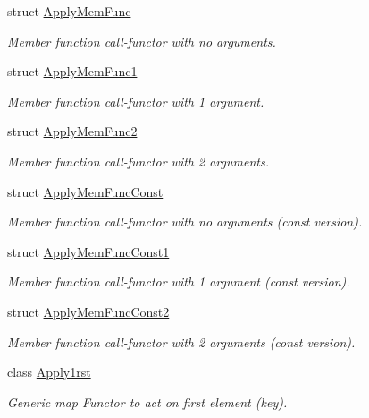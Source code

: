 \begin{DoxyCompactItemize}
struct \hyperlink{struct_d_d4hep_1_1_apply_mem_func}{ApplyMemFunc}
\begin{DoxyCompactList}\small\item\em Member function call-\/functor with no arguments. \item\end{DoxyCompactList}\item 
struct \hyperlink{struct_d_d4hep_1_1_apply_mem_func1}{ApplyMemFunc1}
\begin{DoxyCompactList}\small\item\em Member function call-\/functor with 1 argument. \item\end{DoxyCompactList}\item 
struct \hyperlink{struct_d_d4hep_1_1_apply_mem_func2}{ApplyMemFunc2}
\begin{DoxyCompactList}\small\item\em Member function call-\/functor with 2 arguments. \item\end{DoxyCompactList}\item 
struct \hyperlink{struct_d_d4hep_1_1_apply_mem_func_const}{ApplyMemFuncConst}
\begin{DoxyCompactList}\small\item\em Member function call-\/functor with no arguments (const version). \item\end{DoxyCompactList}\item 
struct \hyperlink{struct_d_d4hep_1_1_apply_mem_func_const1}{ApplyMemFuncConst1}
\begin{DoxyCompactList}\small\item\em Member function call-\/functor with 1 argument (const version). \item\end{DoxyCompactList}\item 
struct \hyperlink{struct_d_d4hep_1_1_apply_mem_func_const2}{ApplyMemFuncConst2}
\begin{DoxyCompactList}\small\item\em Member function call-\/functor with 2 arguments (const version). \item\end{DoxyCompactList}\item 
class \hyperlink{class_d_d4hep_1_1_apply1rst}{Apply1rst}
\begin{DoxyCompactList}\small\item\em Generic map Functor to act on first element (key). \item\end{DoxyCompactList}\item 

\end{DoxyCompactItemize}
